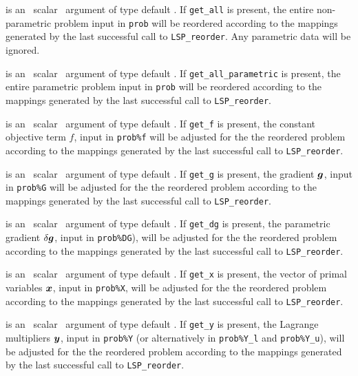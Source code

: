 \documentclass{galahad}
\newcommand{\packagename}{LSP}
\begin{document}
\begin{description}
is an \optional\ scalar \intentin\ argument of type default \logical. 
If {\tt get\_all} is present, the entire non-parametric problem 
input in {\tt prob} will be reordered according to the 
mappings generated by the last successful call to {\tt \packagename\_reorder}. 
Any parametric data will be ignored.

is an \optional\ scalar \intentin\ argument of type default \logical. 
If {\tt get\_all\_parametric} is present, the entire parametric problem 
input in {\tt prob} will be reordered according to the 
mappings generated by the last successful call to {\tt \packagename\_reorder}. 
 
is an \optional\ scalar \intentin\ argument of type default \logical. 
If {\tt get\_f} is present, the constant objective term
$f$, input in {\tt prob\%f} 
will be adjusted for the the reordered problem according to the 
mappings generated by the last successful call to {\tt \packagename\_reorder}. 
 
is an \optional\ scalar \intentin\ argument of type default \logical. 
If {\tt get\_g} is present, the gradient 
${\bm{g}}$, input in {\tt prob\%G} 
will be adjusted for the the reordered problem according to the 
mappings generated by the last successful call to {\tt \packagename\_reorder}. 
 
is an \optional\ scalar \intentin\ argument of type default \logical. 
If {\tt get\_dg} is present, the parametric gradient $\delta {\bm{g}}$, input in 
{\tt prob\%DG}),
will be adjusted for the the reordered problem according to the 
mappings generated by the last successful call to {\tt \packagename\_reorder}. 
 
is an \optional\ scalar \intentin\ argument of type default \logical. 
If {\tt get\_x} is present, the vector of primal variables ${\bm{x}}$, 
input in {\tt prob\%X}, will be 
adjusted for the the reordered problem according to the 
mappings generated by the last successful call to {\tt \packagename\_reorder}. 
 
is an \optional\ scalar \intentin\ argument of type default \logical. 
If {\tt get\_y} is present, the 
Lagrange multipliers ${\bm{y}}$, input in {\tt prob\%Y}
(or alternatively in {\tt prob\%Y\_l} and {\tt prob\%Y\_u}), 
will be adjusted for the the reordered problem according to the 
mappings generated by the last successful call to {\tt \packagename\_reorder}. 


\end{description}
\end{document}

